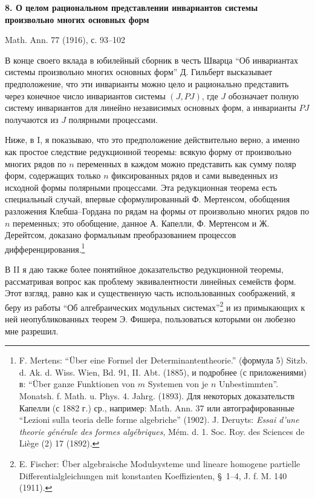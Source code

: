 \documentclass[11pt]{article}
\begin{document}
\begin{center}
{\Large\bfseries 8. О целом рациональном представлении инвариантов системы произвольно многих основных форм}\par
\vspace{1.2em}
Math. Ann. 77 (1916), с. 93--102
\end{center}

\vspace{1em}

В конце своего вклада в юбилейный сборник в честь Шварца ``Об инвариантах системы произвольно многих основных форм'' Д. Гильберт высказывает предположение, что эти инварианты можно цело и рационально представить через конечное число инвариантов системы $(J,PJ)$, где $J$ обозначает полную систему инвариантов для линейно независимых основных форм, а инварианты $PJ$ получаются из $J$ полярными процессами.

Ниже, в I, я показываю, что это предположение действительно верно, а именно как простое следствие редукционной теоремы: всякую форму от произвольно многих рядов по $n$ переменных в каждом можно представить как сумму поляр форм, содержащих только $n$ фиксированных рядов и сами выведенных из исходной формы полярными процессами. Эта редукционная теорема есть специальный случай, впервые сформулированный Ф. Мертенсом, обобщения разложения Клебша--Гордана по рядам на формы от произвольно многих рядов по $n$ переменных; это обобщение, данное А. Капелли, Ф. Мертенсом и Ж. Дерейтсом, доказано формальным преобразованием процессов дифференцирования.\footnote{F. Mertens: ``Über eine Formel der Determinantentheorie.'' (формула 5) Sitzb. d. Ak. d. Wiss. Wien, Bd. 91, II. Abt. (1885), и подробнее (с приложениями) в: ``Über ganze Funktionen von $m$ Systemen von je $n$ Unbestimmten''. Monatsh. f. Math. u. Phys. 4. Jahrg. (1893). Для некоторых доказательств Капелли (с 1882 г.) ср., например: Math. Ann. 37 или автографированные ``Lezioni sulla teoria delle forme algebriche'' (1902). J. Deruyts: \emph{Essai d'une theorie générale des formes algébriques}, Mém. d. 1. Soc. Roy. des Sciences de Liège (2) 17 (1892).}

В II я даю также более понятийное доказательство редукционной теоремы, рассматривая вопрос как проблему эквивалентности линейных семейств форм. Этот взгляд, равно как и существенную часть использованных соображений, я беру из работы ``Об алгебраических модульных системах''\footnote{E. Fischer: Über algebraische Modulsysteme und lineare homogene partielle Differentialgleichungen mit konstanten Koeffizienten, \S\ 1--4, J. f. M. 140 (1911).} и из примыкающих к ней неопубликованных теорем Э. Фишера, пользоваться которыми он любезно мне разрешил.
\end{document}
